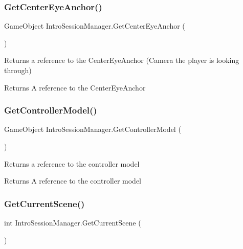 \subsubsection{\texorpdfstring{Get\+Center\+Eye\+Anchor()}{GetCenterEyeAnchor()}}
{\footnotesize\ttfamily Game\+Object Intro\+Session\+Manager.\+Get\+Center\+Eye\+Anchor (\begin{DoxyParamCaption}{ }\end{DoxyParamCaption})}



Returns a reference to the Center\+Eye\+Anchor (Camera the player is looking through) 

\begin{DoxyReturn}{Returns}
A reference to the Center\+Eye\+Anchor
\end{DoxyReturn}
\mbox{\label{class_intro_session_manager_a836a60ce3ae8f1fb514c81f3c59da3ad}} 
\subsubsection{\texorpdfstring{Get\+Controller\+Model()}{GetControllerModel()}}
{\footnotesize\ttfamily Game\+Object Intro\+Session\+Manager.\+Get\+Controller\+Model (\begin{DoxyParamCaption}{ }\end{DoxyParamCaption})}



Returns a reference to the controller model 

\begin{DoxyReturn}{Returns}
A reference to the controller model
\end{DoxyReturn}
\mbox{\label{class_intro_session_manager_a16f670a63e6d68ef3ae65573b3a7b01f}} 
\subsubsection{\texorpdfstring{Get\+Current\+Scene()}{GetCurrentScene()}}
{\footnotesize\ttfamily int Intro\+Session\+Manager.\+Get\+Current\+Scene (\begin{DoxyParamCaption}{ }\end{DoxyParamCaption})}



